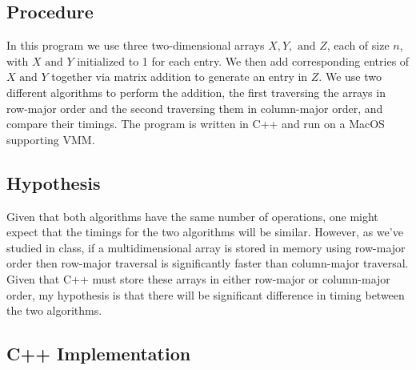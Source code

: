 \documentclass[11pt]{article}
\begin{document}
\subsection*{Procedure}

In this program we use three two-dimensional arrays $X, Y, \text{ and } Z$, each of size $n$, with $X \text{ and } Y$ initialized to 1 for each entry. We then add corresponding entries of $X \text{ and } Y$ together via matrix addition to generate an entry in $Z$. We use two different algorithms to perform the addition, the first traversing the arrays in row-major order and the second traversing them in column-major order, and compare their timings. The program is written in C++ and run on a MacOS supporting VMM.

\subsection*{Hypothesis}

Given that both algorithms have the same number of operations, one might expect that the timings for the two algorithms will be similar. However, as we've studied in class, if a multidimensional array is stored in memory using row-major order then row-major traversal is significantly faster than column-major traversal. Given that C++ must store these arrays in either row-major or column-major order, my hypothesis is that there will be significant difference in timing between the two algorithms.

\subsection*{C++ Implementation}
\end{document}
